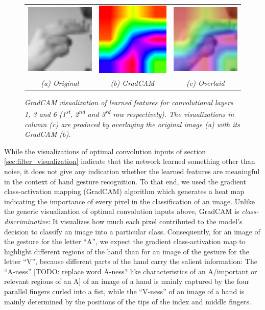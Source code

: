 \documentclass[a4paper]{article}
\newcommand{\ts}{\textsuperscript}
\begin{document}
\begin{figure}[t]
\begin{tabular}{ccc}
          \includegraphics[width=.25\linewidth]{graphics/gradcam/layer6/1_original}&\includegraphics[width=.25\linewidth]{graphics/gradcam/layer6/1_map}&\includegraphics[width=.25\linewidth]{graphics/gradcam/layer6/1_overlaid} \\
          \textit{(a) Original} & \textit{(b) GradCAM} & \textit{(c) Overlaid}
     \end{tabular}
     \caption{\textit{GradCAM visualization of learned features for convolutional layers 1, 3 and 6 (1\ts{st}, 2\ts{nd} and 3\ts{rd} row respectively). The visualizations in column (c) are produced by overlaying the original image (a) with its GradCAM (b).}}
     \label{fig:gradcam}
\end{figure}
While the visualizations of optimal convolution inputs of section \ref{sec:filter_visualization} indicate that the network learned something other than noise, it does not give any indication whether the learned features are meaningful in the context of hand gesture recognition. To that end, we used the gradient class-activation mapping (GradCAM) algorithm \cite{Selvaraju2016} which generates a heat map indicating the importance of every pixel in the classification of an image. Unlike the generic visualization of optimal convolution inputs above, GradCAM is \textit{class-discriminative}: It visualizes how much each pixel contributed to the model's decision to classify an image into a particular class. Consequently, for an image of the gesture for the letter \enquote{A}, we expect the gradient class-activation map to highlight different regions of the hand than for an image of the gesture for the letter \enquote{V}, because different parts of the hand carry the salient information: The \enquote{A-ness} [TODO: replace word A-ness? like characteristics of an A/important or relevant regions of an A] of an image of a hand is mainly captured by the four parallel fingers curled into a fist, while the \enquote{V-ness} of an image of a hand is mainly determined by the positions of the tips of the index and middle fingers.\\
\end{document}
